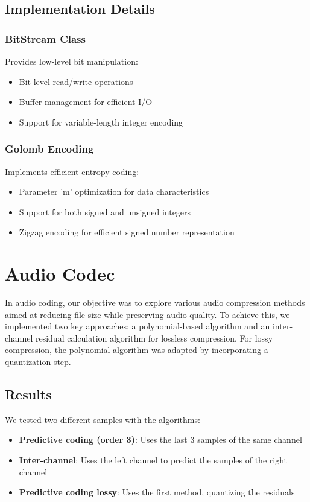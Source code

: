 \documentclass[a4paper,14pt]{article}
\begin{document}
\subsection{Implementation Details}

\subsubsection{BitStream Class}
Provides low-level bit manipulation:
\begin{itemize}
    \item Bit-level read/write operations
    \item Buffer management for efficient I/O
    \item Support for variable-length integer encoding
\end{itemize}

\subsubsection{Golomb Encoding}
Implements efficient entropy coding:
\begin{itemize}
    \item Parameter 'm' optimization for data characteristics
    \item Support for both signed and unsigned integers
    \item Zigzag encoding for efficient signed number representation
\end{itemize}

\section{Audio Codec}
In audio coding, our objective was to explore various audio compression methods aimed at reducing file size while preserving audio quality. To achieve this, we implemented two key approaches: a polynomial-based algorithm and an inter-channel residual calculation algorithm for lossless compression. For lossy compression, the polynomial algorithm was adapted by incorporating a quantization step.

\subsection{Results}
We tested two different samples with the algorithms:
\begin{itemize}
    \item \textbf{Predictive coding (order 3)}: Uses the last 3 samples of the same channel
    \item \textbf{Inter-channel}: Uses the left channel to predict the samples of the right channel
    \item \textbf{Predictive coding lossy}: Uses the first method, quantizing the residuals    
\end{itemize}
\end{document}

